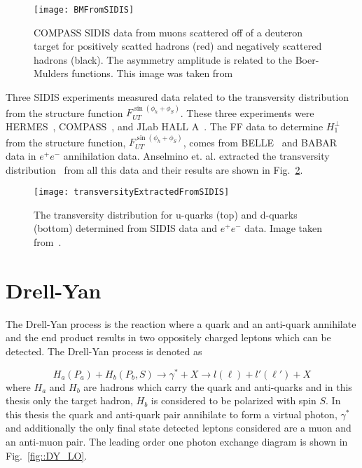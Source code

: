 \begin{figure}[h!t]
  \centering
  \texttt{[image: BMFromSIDIS]}
  \caption{COMPASS SIDIS data from muons scattered off of a deuteron target for
    positively scatted hadrons (red) and negatively scattered hadrons (black).
    The asymmetry amplitude is related to the Boer-Mulders functions.  This
    image was taken from~\cite{Adolph:2014pwc}}
  \label{fig::BMFromSIDIS}
\end{figure}

Three SIDIS experiments measured data related to the transversity distribution
from the structure function $F_{UT}^{\sin(\phi_h +\phi_S)}$.  These three
experiments were HERMES~\cite{Airapetian:2004tw,Airapetian:2010ds},
COMPASS~\cite{Ageev:2006da,Alekseev:2008aa,Alekseev:2010rw,Adolph:2012sn,Adolph:2014zba},
and JLab HALL A~\cite{PhysRevLett.107.072003}.  The FF data to determine
$H_1^{\perp }$ from the structure function, $F_{UT}^{\sin(\phi_h +\phi_S)}$,
comes from BELLE~\cite{Abe:2005zx,Seidl:2008xc} and
BABAR~\cite{TheBABAR:2013yha} data in $e^+e^-$ annihilation data.  Anselmino
et. al. extracted the transversity distribution~\cite{PhysRevD.87.094019} from
all this data and their results are shown in
Fig.~\ref{fig::transversityExtractedFromSIDIS}.

\begin{figure}[h!t]
  \centering \texttt{[image: transversityExtractedFromSIDIS]}
  \caption{The transversity distribution for u-quarks (top) and d-quarks
    (bottom) determined from SIDIS data and $e^+e^-$ data.  Image taken
    from~\cite{PhysRevD.87.094019}.}
  \label{fig::transversityExtractedFromSIDIS}
\end{figure}


\section{Drell-Yan} \label{sec::DY}
The Drell-Yan process is the reaction where a quark and an anti-quark annihilate
and the end product results in two oppositely charged leptons which can be
detected.  The Drell-Yan process is denoted as

\begin{equation}
  H_a(P_a) + H_b(P_b, S) \rightarrow \gamma^* + X \rightarrow l(\ell) +
  l'(\ell') + X
\end{equation}
\noindent
where $H_a$ and $H_b$ are hadrons which carry the quark and anti-quarks and in
this thesis only the target hadron, $H_b$ is considered to be polarized with
spin $S$.  In this thesis the quark and anti-quark pair annihilate to form a
virtual photon, $\gamma^*$ and additionally the only final state detected
leptons considered are a muon and an anti-muon pair.  The leading order one
photon exchange diagram is shown in Fig.~\ref{fig::DY_LO}.

